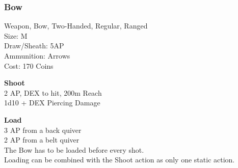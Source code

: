 \subsubsection{Bow}\label{weapon:bow}
Weapon, Bow, Two-Handed, Regular, Ranged\\
Size: M\\
Draw/Sheath: 5AP\\
Ammunition: Arrows\\
Cost: 170 Coins

\textbf{Shoot}\\
2 AP, DEX to hit, 200m Reach\\
1d10 + \texttimes DEX Piercing Damage

\textbf{Load}\\
3 AP from a back quiver\\
2 AP from a belt quiver\\
The Bow has to be loaded before every shot.\\
Loading can be combined with the Shoot action as only one static action.